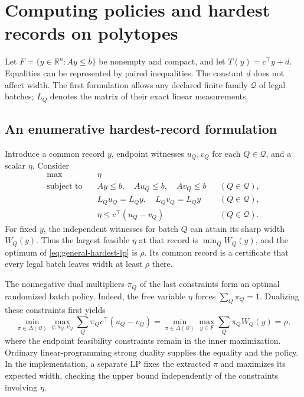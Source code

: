 \section{Computing policies and hardest records on polytopes}\label{sec:general-algorithms}
Let $F=\{y\in\mathbb R^n:Ay\le b\}$ be nonempty and compact, and let
$T(y)=c^\top y+d$. Equalities can be represented by paired inequalities.
The constant $d$ does not affect width. The first formulation allows any
declared finite family $\mathcal Q$ of legal batches; $L_Q$ denotes the matrix
of their exact linear measurements.

\subsection{An enumerative hardest-record formulation}
Introduce a common record $y$, endpoint witnesses $u_Q,v_Q$ for each
$Q\in\mathcal Q$, and a scalar $\eta$. Consider
\begin{equation}\label{eq:general-hardest-lp}
\begin{aligned}
\max\quad &\eta\\
\text{subject to}\quad &Ay\le b,\quad Au_Q\le b,\quad Av_Q\le b
                         &&(Q\in\mathcal Q),\\
&L_Qu_Q=L_Qy,\quad L_Qv_Q=L_Qy &&(Q\in\mathcal Q),\\
&\eta\le c^\top(u_Q-v_Q) &&(Q\in\mathcal Q).
\end{aligned}
\end{equation}
For fixed $y$, the independent witnesses for batch $Q$ can attain its sharp
width $W_Q(y)$. Thus the largest feasible $\eta$ at that record is
$\min_Q W_Q(y)$, and the optimum of \eqref{eq:general-hardest-lp} is $\rho$.
Its common record is a certificate that every legal batch leaves width at
least $\rho$ there.

The nonnegative dual multipliers $\pi_Q$ of the last constraints form an
optimal randomized batch policy. Indeed, the free variable $\eta$ forces
$\sum_Q\pi_Q=1$. Dualizing these constraints first yields
\[
\min_{\pi\in\Delta(\mathcal Q)}
 \max_{y,u_Q,v_Q}\sum_Q\pi_Qc^\top(u_Q-v_Q)
 =\min_{\pi\in\Delta(\mathcal Q)}\max_{y\in F}
       \sum_Q\pi_Q W_Q(y)=\rho,
\]
where the endpoint feasibility constraints remain in the inner maximization.
Ordinary linear-programming strong duality supplies the equality and the
policy. In the implementation, a separate
LP fixes the extracted $\pi$ and maximizes its expected width, checking the
upper bound independently of the constraints involving $\eta$.

